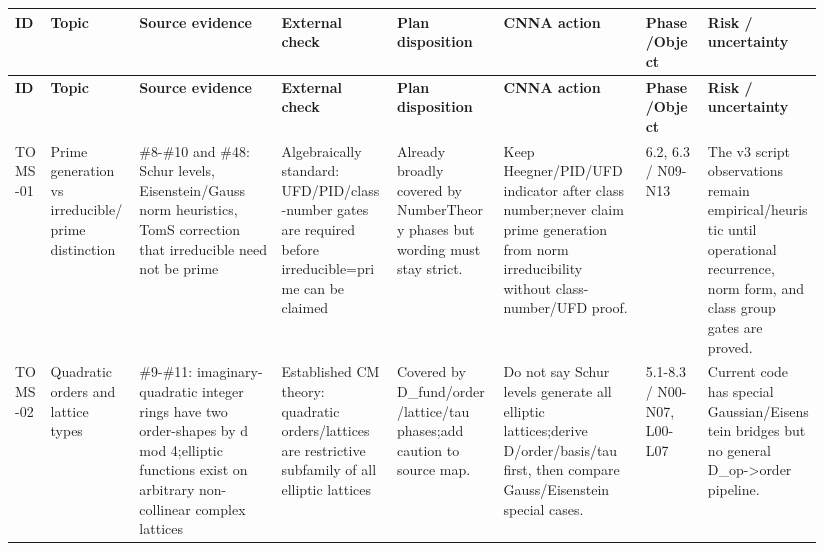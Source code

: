 \footnotesize
{}
\begin{longtable}{L{0.04\linewidth} L{0.105\linewidth} L{0.16\linewidth} L{0.13\linewidth} L{0.125\linewidth} L{0.165\linewidth} L{0.075\linewidth} L{0.135\linewidth}}
\hline
\textbf{ID} & \textbf{Topic} & \textbf{Source evidence} & \textbf{External check} & \textbf{Plan disposition} & \textbf{CNNA action} & \textbf{Phase/\allowbreak{}Object} & \textbf{Risk /\allowbreak{} uncertainty}\\
\hline
\endfirsthead
\hline
\textbf{ID} & \textbf{Topic} & \textbf{Source evidence} & \textbf{External check} & \textbf{Plan disposition} & \textbf{CNNA action} & \textbf{Phase/\allowbreak{}Object} & \textbf{Risk /\allowbreak{} uncertainty}\\
\hline
\endhead
TOMS-01 & Prime generation vs irreducible/\allowbreak{}prime distinction & \#8-\#10 and \#48: Schur levels, Eisenstein/\allowbreak{}Gauss norm heuristics, TomS correction that irreducible need not be prime & Algebraically standard: UFD/\allowbreak{}PID/\allowbreak{}class-number gates are required before irreducible=prime can be claimed & Already broadly covered by NumberTheory phases but wording must stay strict. & Keep Heegner/\allowbreak{}PID/\allowbreak{}UFD indicator after class number;\newline never claim prime generation from norm irreducibility without class-number/\allowbreak{}UFD proof. & 6.2, 6.3 /\allowbreak{} N09-N13 & The v3 script observations remain empirical/\allowbreak{}heuristic until operational recurrence, norm form, and class group gates are proved.\\
\hline
\addlinespace[0.24em]
TOMS-02 & Quadratic orders and lattice types & \#9-\#11: imaginary-quadratic integer rings have two order-shapes by d mod 4;\newline elliptic functions exist on arbitrary non-collinear complex lattices & Established CM theory: quadratic orders/\allowbreak{}lattices are restrictive subfamily of all elliptic lattices & Covered by D\_fund/\allowbreak{}order/\allowbreak{}lattice/\allowbreak{}tau phases;\newline add caution to source map. & Do not say Schur levels generate all elliptic lattices;\newline derive D/\allowbreak{}order/\allowbreak{}basis/\allowbreak{}tau first, then compare Gauss/\allowbreak{}Eisenstein special cases. & 5.1-8.3 /\allowbreak{} N00-N07, L00-L07 & Current code has special Gaussian/\allowbreak{}Eisenstein bridges but no general D\_op->order pipeline.\\

\end{longtable}

